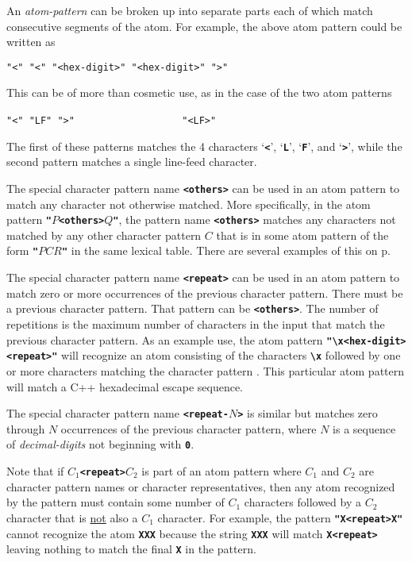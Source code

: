 \documentclass[12pt]{article}
\newcommand{\TT}[1]{{\tt \bfseries #1}}
\newcommand{\pagref}[1]{p\pageref{#1}}
\begin{document}
An {\em atom-pattern} can be broken up into separate parts
each of which match consecutive segments of the atom.  For
example, the above atom pattern could be written as
\begin{center}
\verb|"<" "<" "<hex-digit>" "<hex-digit>" ">"|
\end{center}
This can be of more than cosmetic use, as in the case of the two atom patterns
\begin{center}
\verb|"<" "LF" ">"| ~~~~~~~~~~~~~~~~~~ \verb|"<LF>"|
\end{center}
The first of these patterns matches the 4 characters `\TT{<}', `\TT{L}',
`\TT{F}', and `\TT{>}', while the second pattern
matches a single line-feed character.


The special character pattern name
\TT{<{others}>}%
%
\label{<OTHERS>}
can be used in an atom pattern to match any character not otherwise
matched.  More specifically, in the atom pattern
\TT{"}$P$\TT{<others>}$Q$\TT{"},
the pattern name \TT{<others>} matches any characters not matched by
any other character pattern $C$ that is in some atom pattern of the form
\TT{"}$PCR$\TT{"} in the same lexical table.
There are several examples of this on \pagref{EXAMPLE-LEXEME-PROGRAM}.

The special character pattern name
\TT{<{repeat}>}%
%
\label{<REPEAT>}
can be used in an atom pattern to match zero or more occurrences of
the previous character pattern.  There must be a previous character
pattern.  That pattern can be \TT{<others>}.
The number of repetitions is the maximum number of characters in
the input that match the previous character pattern.
As an example use, the atom pattern \TT{"\textbackslash x<hex-digit><repeat>"}
will recognize an atom consisting of the characters \TT{\textbackslash x}
followed by one or more characters matching the character pattern
\TT{<hex-digit>}.  This particular atom pattern will match a C++
hexadecimal escape sequence.

The special character pattern name
\TT{<{repeat-$N$}>}%
%
is similar but matches zero through $N$ occurrences of the previous
character pattern, where $N$ is a sequence of {\em decimal-digits}
not beginning with \TT{0}.

Note that if \TT{$C_1$<repeat>$C_2$} is part of an atom pattern where
$C_1$ and $C_2$ are character pattern names or character representatives, then
any atom recognized by the pattern must contain some number of
$C_1$ characters followed by a $C_2$ character that is \underline{not} also
a $C_1$ character.
For example, the pattern
\TT{"X<repeat>X"} cannot recognize the atom \TT{XXX} because the
string \TT{XXX} will match \TT{X<repeat>} leaving nothing to match
the final \TT{X} in the pattern.
\end{document}
